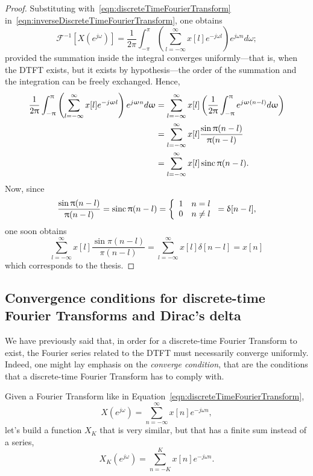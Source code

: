 \documentclass[\documentfontsize, twocolumn]{\classname}
\begin{document}
\begin{proof}
    Substituting with~\ref{eqn:discreteTimeFourierTransform} in~\ref{eqn:inverseDiscreteTimeFourierTransform}, one obtains
    \[
        \mathcal F^{-1}\left[X(e^{j\omega})\right] = \frac 1 {2\pi} \int_{-\pi}^\pi \left(\sum_{l=-\infty}^\infty x[l]e^{-j\omega l}\right)e^{j\omega n} d\omega;
    \]
    provided the summation inside the integral converges u\-ni\-for\-mly---that is, when the DTFT exists, but it exists by hy\-po\-the\-sis---the order of the summation and the integration can be freely exchanged. Hence,
    \begin{align*}
        \frac 1 {2\uppi} \int_{-\uppi}^\uppi \left(\sum_{l=-\infty}^\infty x[l]e^{-j\upomega l}\right)e^{j\upomega n} d\upomega &= \sum_{l=-\infty}^\infty x[l]\left(\frac 1 {2\uppi} \int_{-\uppi}^\uppi e^{j\upomega(n-l)} d\upomega\right)\\
                                                                                                                    &= \sum_{l=-\infty}^\infty x[l]\frac {\sin{\uppi(n-l)}}{\uppi(n-l)}\\
                                                                                                                    &= \sum_{l=-\infty}^\infty x[l]\operatorname{sinc}{\uppi(n-l)}.
    \end{align*}
    Now, since
    \[ \frac {\sin{\uppi(n-l)}}{\uppi(n-l)} = \operatorname{sinc} {\uppi(n-l)} = \left\{\begin{array}{ll} 1 & n = l \\ 0 & n \neq l\end{array}\right. = \updelta[n-l],\]
    one soon obtains
    \[
        \sum_{l=-\infty}^\infty x[l] \frac {\sin{\pi(n-l)}}{\pi(n-l)} = \sum_{l=-\infty}^\infty x[l]\delta[n-l] = x[n]
    \]
    which corresponds to the thesis.
\end{proof}

\subsection{Convergence conditions for discrete-time Fou\-rier Transforms and Dirac's delta}

We have previously said that, in order for a discrete-time Fourier Transform to exist, the Fourier series related to the DTFT must necessarily converge uniformly. Indeed, one might lay emphasis on the \emph{converge condition}, that are the conditions that a discrete-time Fourier Transform has to comply with.

Given a Fourier Transform like in Equation~\ref{eqn:discreteTimeFourierTransform},
\[
    X(e^{j\omega}) = \sum_{n=-\infty}^\infty x[n] e^{-j\omega n},
\]
let's build a function $X_K$ that is very similar, but that has a finite sum instead of a series,
\[
    X_K(e^{j\omega}) = \sum_{n=-K}^K x[n] e^{-j\omega n}.
\]
\end{document}
